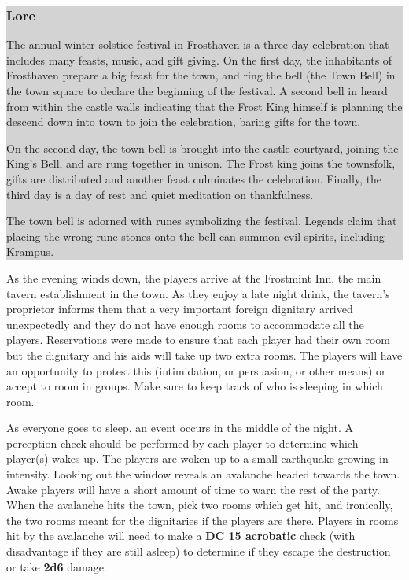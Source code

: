 \documentclass{article}
\begin{document}
\begin{multicols*}{2}
	\colorbox{lightgray}{\begin{minipage}{0.4\textwidth}
\subsubsection*{Lore}
The annual winter solstice festival in Frosthaven is a three day celebration that includes many feasts, music, and gift giving.  On the first day, the inhabitants of Frosthaven prepare a big feast for the town, and ring the bell (the Town Bell) in the town square to declare the beginning of the festival. A second bell in heard from within the castle walls indicating that the Frost King himself is planning the descend down into town to join the celebration, baring gifts for the town.

On the second day, the town bell is brought into the castle courtyard, joining the King's Bell, and are rung together in unison. The Frost king joins the townsfolk, gifts are distributed and another feast culminates the celebration. Finally, the third day is a day of rest and quiet meditation on thankfulness. 

The town bell is adorned with runes symbolizing the festival. Legends claim that placing the wrong rune-stones onto the bell can summon evil spirits, including Krampus.
\end{minipage}}
\break

	As the evening winds down, the players arrive at the Frostmint Inn, the main tavern establishment in the town. As they enjoy a late night drink, the tavern's proprietor informs them that a very important foreign dignitary arrived unexpectedly and they do not have enough rooms to accommodate all the players. Reservations were made to ensure that each player had their own room but the dignitary and his aids will take up two extra rooms. The players will have an opportunity to protest this (intimidation, or persuasion, or other means) or accept to room in groups. Make sure to keep track of who is sleeping in which room.
	
	As everyone goes to sleep, an event occurs in the middle of the night. A perception check should be performed by each player to determine which player(s) wakes up. The players are woken up to a small earthquake growing in intensity. Looking out the window reveals an avalanche headed towards the town. Awake players will have a short amount of time to warn the rest of the party. When the avalanche hits the town, pick two rooms which get hit, and ironically, the two rooms meant for the dignitaries if the players are there. Players in rooms hit by the avalanche will need to make a \textbf{DC 15 acrobatic} check (with disadvantage if they are still asleep) to determine if they escape the destruction or take \textbf{2d6} damage.
	

\end{multicols*}
\end{document}
